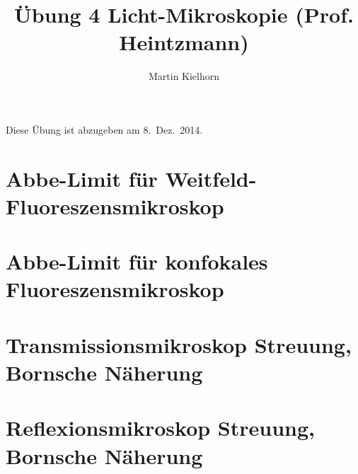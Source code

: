 \documentclass{article}
\begin{document}
\author{Martin Kielhorn}
\title{\"Ubung 4 Licht-Mikroskopie (Prof. Heintzmann)}
\maketitle
\noindent Diese \"Ubung ist abzugeben am 8.~Dez.~2014.

\section{Abbe-Limit f\"ur Weitfeld-Fluoreszensmikroskop}
\section{Abbe-Limit f\"ur konfokales Fluoreszensmikroskop}
\section{Transmissionsmikroskop Streuung, Bornsche N\"aherung}
\section{Reflexionsmikroskop Streuung, Bornsche N\"aherung}
\end{document}
